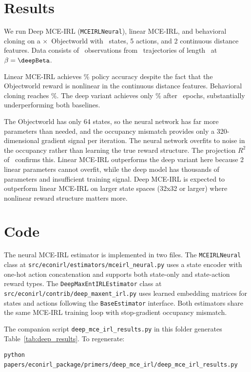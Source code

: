 \documentclass[10pt]{article}
\begin{document}
\section{Results}



We run Deep MCE-IRL (\texttt{MCEIRLNeural}), linear MCE-IRL, and behavioral cloning on a \deepGridSize$\times$\deepGridSize\ Objectworld with \deepNstates\ states, 5 actions, and 2 continuous distance features. Data consists of \deepNobs\ observations from \deepNdemos\ trajectories of length \deepTrajLen\ at $\beta = \deepBeta$.

Linear MCE-IRL achieves \deepMcePolicyAcc\% policy accuracy despite the fact that the Objectworld reward is nonlinear in the continuous distance features. Behavioral cloning reaches \deepBcPolicyAcc\%. The deep variant achieves only \deepDeepPolicyAcc\% after \deepDeepEpochs\ epochs, substantially underperforming both baselines.

The Objectworld has only 64 states, so the neural network has far more parameters than needed, and the occupancy mismatch provides only a 320-dimensional gradient signal per iteration. The neural network overfits to noise in the occupancy rather than learning the true reward structure. The projection $R^2$ of \deepDeepProjectionR\ confirms this. Linear MCE-IRL outperforms the deep variant here because 2 linear parameters cannot overfit, while the deep model has thousands of parameters and insufficient training signal. Deep MCE-IRL is expected to outperform linear MCE-IRL on larger state spaces (32x32 or larger) where nonlinear reward structure matters more.


\section{Code}

The neural MCE-IRL estimator is implemented in two files. The \texttt{MCEIRLNeural} class at \texttt{src/econirl/estimators/mceirl\_neural.py} uses a state encoder with one-hot action concatenation and supports both state-only and state-action reward types. The \texttt{DeepMaxEntIRLEstimator} class at \texttt{src/econirl/contrib/deep\_maxent\_irl.py} uses learned embedding matrices for states and actions following the \texttt{BaseEstimator} interface. Both estimators share the same MCE-IRL training loop with stop-gradient occupancy mismatch.

The companion script \texttt{deep\_mce\_irl\_results.py} in this folder generates Table~\ref{tab:deep_results}. To regenerate:
\begin{verbatim}
python papers/econirl_package/primers/deep_mce_irl/deep_mce_irl_results.py
\end{verbatim}




\end{document}
